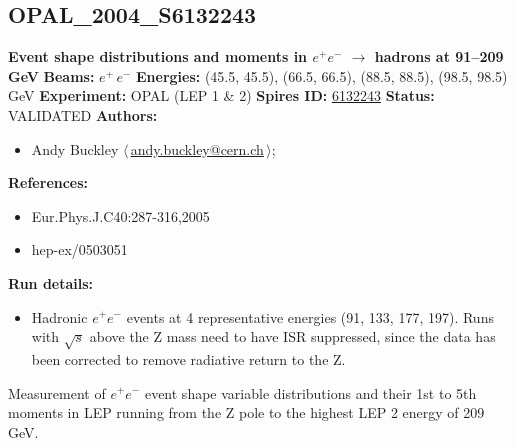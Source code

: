 \subsection[OPAL\_2004\_S6132243]{OPAL\_2004\_S6132243\,\cite{Abbiendi:2004qz}}
\textbf{Event shape distributions and moments in $e^+ e^-$ \ensuremath{\to} hadrons at 91--209 GeV}\newline
\textbf{Beams:} $e^+$\,$e^-$ \newline
\textbf{Energies:} (45.5, 45.5), (66.5, 66.5), (88.5, 88.5), (98.5, 98.5) GeV \newline
\textbf{Experiment:} OPAL (LEP 1 \& 2) \newline
\textbf{Spires ID:} \href{http://www.slac.stanford.edu/spires/find/hep/www?rawcmd=key+6132243}{6132243}\newline
\textbf{Status:} VALIDATED\newline
\textbf{Authors:}
\begin{itemize}
  \item Andy Buckley $\langle\,$\href{mailto:andy.buckley@cern.ch}{andy.buckley@cern.ch}$\,\rangle$;
\end{itemize}
\textbf{References:}
\begin{itemize}
  \item Eur.Phys.J.C40:287-316,2005
  \item hep-ex/0503051
\end{itemize}
\textbf{Run details:}
\begin{itemize}

  \item Hadronic $e^+ e^-$ events at 4 representative energies (91, 133, 177, 197). Runs with \ensuremath{\sqrt{s}} above the Z mass need to have ISR suppressed, since the data has been corrected to remove radiative return to the Z.\end{itemize}

\noindent Measurement of $e^+ e^-$ event shape variable distributions and their 1st to 5th moments in LEP running from the Z pole to the highest LEP 2 energy of 209 GeV.

\clearpage



